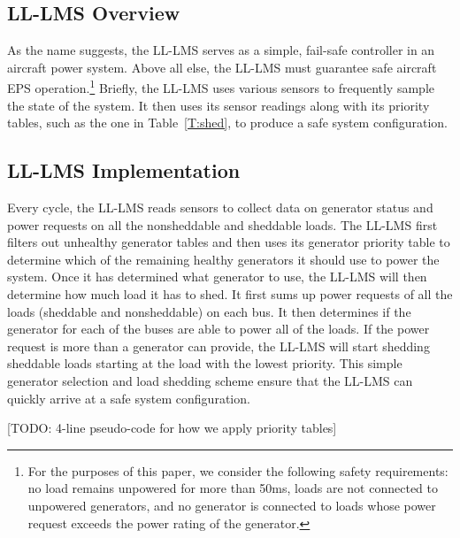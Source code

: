 \documentclass{acm_proc_article-sp}
\begin{document}
\subsection{LL-LMS Overview}
As the name suggests, the LL-LMS serves as a simple, fail-safe controller in an aircraft power system.
Above all else, the LL-LMS must guarantee safe aircraft EPS operation.\footnote{For the purposes of this paper, we consider the following safety requirements: no load remains unpowered for more than 50ms, loads are not connected to unpowered generators, and no generator is connected to loads whose power request exceeds the power rating of the generator.}
Briefly, the LL-LMS uses various sensors to frequently sample the state of the system. It then uses its sensor readings along with its
priority tables, such as the one in Table~\ref{T:shed}, to produce a safe system configuration.

\subsection{LL-LMS Implementation}
Every cycle, the LL-LMS reads sensors to collect data on generator status and power requests on all the nonsheddable and sheddable loads. 
The LL-LMS first filters out unhealthy generator tables and then uses its generator priority table to determine which of the remaining healthy generators it should use to power the system. 
Once it has determined what generator to use, the LL-LMS will then determine how much load it has to shed. 
It first sums up power requests of all the loads (sheddable and nonsheddable) on each bus. 
It then determines if the generator for each of the buses are able to power all of the loads. 
If the power request is more than a generator can provide, the LL-LMS will start shedding sheddable loads starting at the load with the lowest priority. 
This simple generator selection and load shedding scheme ensure that the LL-LMS can quickly arrive at a safe system configuration.


[TODO: 4-line pseudo-code for how we apply priority tables]
\end{document}
